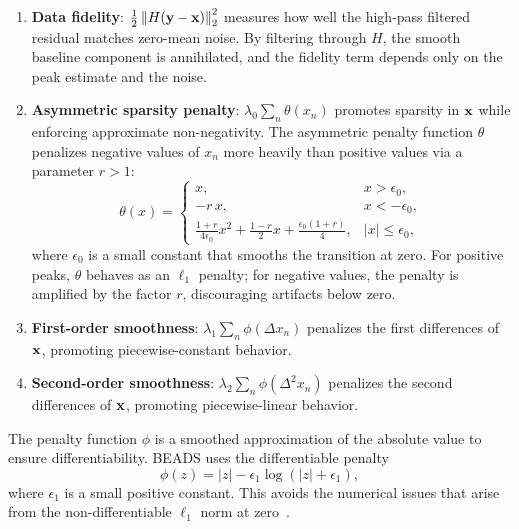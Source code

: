 \begin{enumerate}
    \item \textbf{Data fidelity}: $\frac{1}{2}\left\lVert H(\mathbf{y} - \mathbf{x}) \right\rVert_2^2$ measures how well the high-pass filtered residual matches zero-mean noise. By filtering through $H$, the smooth baseline component is annihilated, and the fidelity term depends only on the peak estimate and the noise.

    \item \textbf{Asymmetric sparsity penalty}: $\lambda_0 \sum_n \theta(x_n)$ promotes sparsity in $\mathbf{x}$ while enforcing approximate non-negativity. The asymmetric penalty function $\theta$ penalizes negative values of $x_n$ more heavily than positive values via a parameter $r > 1$:
    \begin{equation}
        \theta(x) = \begin{cases}
            x, & x > \epsilon_0, \\
            -r\, x, & x < -\epsilon_0, \\
            \frac{1+r}{4\epsilon_0} x^2 + \frac{1-r}{2} x + \frac{\epsilon_0(1+r)}{4}, & |x| \leq \epsilon_0,
        \end{cases}
        \label{eq:theta}
    \end{equation}
    where $\epsilon_0$ is a small constant that smooths the transition at zero. For positive peaks, $\theta$ behaves as an $\ell_1$ penalty; for negative values, the penalty is amplified by the factor $r$, discouraging artifacts below zero.

    \item \textbf{First-order smoothness}: $\lambda_1 \sum_n \phi(\Delta x_n)$ penalizes the first differences of $\mathbf{x}$, promoting piecewise-constant behavior.

    \item \textbf{Second-order smoothness}: $\lambda_2 \sum_n \phi(\Delta^2 x_n)$ penalizes the second differences of $\mathbf{x}$, promoting piecewise-linear behavior.
\end{enumerate}

The penalty function $\phi$ is a smoothed approximation of the absolute value to ensure differentiability. BEADS uses the differentiable penalty
\begin{equation}
    \phi(z) = |z| - \epsilon_1 \log(|z| + \epsilon_1),
    \label{eq:phi}
\end{equation}
where $\epsilon_1$ is a small positive constant. This avoids the numerical issues that arise from the non-differentiable $\ell_1$ norm at zero~\cite{ning2014beads}.

